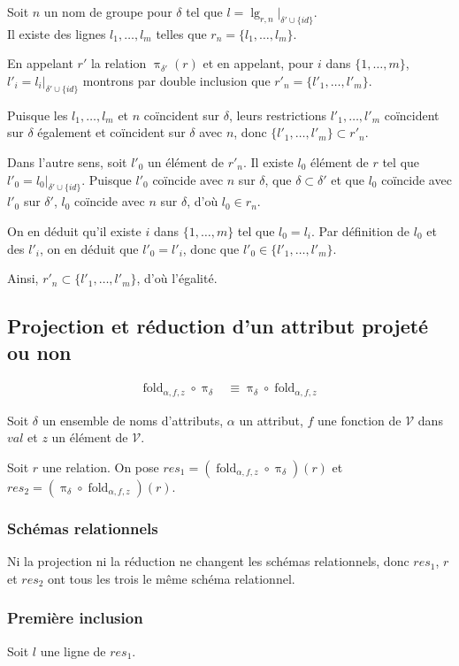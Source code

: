 \documentclass[french]{article}
\DeclareMathOperator{\proj}{\pi}
\DeclareMathOperator{\lgr}{lg}
\newcommand{\projDelta}{\proj_{\delta}}
\newcommand{\val}{\mathcal{V}}
\newcommand{\cip}{\cup \{id\}}
\newcommand{\fold}[3]{\operatorname{fold}_{#1, #2, #3}}
\newcommand{\foldAlphafz}{\fold{\alpha}{f}{z}}
\newcommand{\intro}[2]{Soit $r$ une relation. On pose $res_1 = (#1)(r) $ et $res_2 = (#2)(r) $}
\begin{document}
Soit $n$ un nom de groupe pour $\delta$
tel que $l = \lgr_{r,n}|_{\delta' \cip}$. \\


Il existe des lignes $l_1, \dots, l_m$
telles que $r_n = \{ l_1, \dots, l_m \}$.

En appelant $r'$ la relation $\proj_{\delta'}(r)$ et en appelant,
pour $i$ dans $\{ 1, \dots, m \}$, $l'_i = l_i|_{\delta' \cip}$
montrons par double inclusion que
$r'_n = \{ l'_1, \dots, l'_m \}$.

Puisque les $l_1, \dots, l_m$ et $n$ coïncident sur $\delta$,
leurs restrictions $l'_1, \dots, l'_m$ coïncident sur $\delta$
également et coïncident sur $\delta$ avec $n$, donc
$\{ l'_1, \dots, l'_m \} \subset r'_n$.

Dans l'autre sens, soit $l'_0$ un élément de $r'_n$.
Il existe $l_0$ élément de $r$ tel que
$l'_0 = l_0|_{\delta' \cip}$. Puisque $l'_0$ coïncide
avec $n$ sur $\delta$, que $\delta \subset \delta'$
et que $l_0$ coïncide avec $l'_0$ sur $\delta'$, 
$l_0$ coïncide avec $n$ sur $\delta$, d'où
$l_0 \in r_n$.

On en déduit qu'il existe $i$ dans $\{ 1, \dots, m \}$
tel que $l_0 = l_i$.
Par définition de $l_0$ et des $l'_i$, on en déduit
que $l'_0 = l'_i$, donc que $l'_0 \in \{ l'_1, \dots, l'_m \}$.

Ainsi, $r'_n \subset \{ l'_1, \dots, l'_m \}$, d'où l'égalité.

\subsection*{Projection et réduction d'un attribut projeté ou non}
\begin{align}
\foldAlphafz \circ \projDelta
& \equiv \projDelta \circ \foldAlphafz
\end{align}

Soit $\delta$ un ensemble de noms d'attributs,
$\alpha$ un attribut, $f$ une fonction de $\val$
dans $val$ et $z$ un élément de $\val$.

\intro{\foldAlphafz \circ \projDelta}{\projDelta \circ \foldAlphafz}.

\subsubsection*{Schémas relationnels}
Ni la projection ni la réduction ne changent les schémas relationnels,
donc $res_1$, $r$ et $res_2$ ont tous les trois le même schéma relationnel.

\subsubsection*{Première inclusion}
Soit $l$ une ligne de $res_1$.
\end{document}

